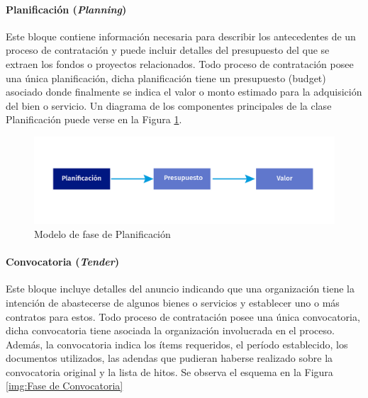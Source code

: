\paragraph{Planificación (\textit{Planning})}\hfill \break
Este bloque contiene información necesaria para describir los antecedentes de un proceso de contratación y puede incluir detalles del presupuesto del que se extraen los fondos o proyectos relacionados. Todo proceso de contratación posee una única planificación, dicha planificación tiene un presupuesto (budget) asociado donde finalmente se indica el valor o monto estimado para la adquisición del bien o servicio. Un diagrama de los componentes principales de la clase Planificación puede verse en la Figura \ref{img:Fase de Planificacion}.

\begin{figure}[htbp!]
    \centering
    \includegraphics[width=150mm]{figuras/Diagramas_Planificacion.png}
    \caption{Modelo de fase de Planificación}
    \label{img:Fase de Planificacion}
\end{figure}

\paragraph{Convocatoria (\textit{Tender})}\hfill \break
Este bloque incluye detalles del anuncio indicando que una organización tiene la intención de abastecerse de algunos bienes o servicios y establecer uno o más contratos para estos. Todo proceso de contratación posee una única convocatoria, dicha convocatoria tiene asociada la organización involucrada en el proceso. Además, la convocatoria indica los ítems requeridos, el período establecido, los documentos utilizados, las adendas que pudieran haberse realizado sobre la convocatoria original y la lista de hitos. Se observa el esquema en la Figura \ref{img:Fase de Convocatoria}

